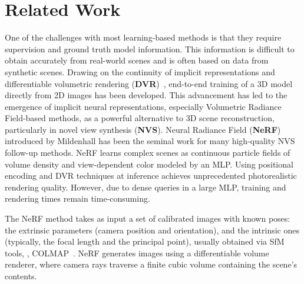 \section{Related Work}
\label{sect:relatedwork}
One of the challenges with most learning-based methods is that they require supervision and ground truth model information. 
This information is difficult to obtain accurately from real-world scenes and is often based on data from synthetic scenes. 
Drawing on the continuity of implicit representations\cite{Park2019DeepSDFLC, Mescheder2018OccupancyNL, Chen2018LearningIF} and differentiable volumetric rendering (\textbf{DVR})~\cite{Lombardi:2019, Sitzmann2018DeepVoxelsLP, Niemeyer2019DifferentiableVR, Sitzmann2019SceneRN}, end-to-end training of a 3D model directly from 2D images has been developed. 
This advancement has led to the emergence of implicit neural representations, especially Volumetric Radiance Field-based methods, as a powerful alternative to 3D scene reconstruction, particularly in novel view synthesis (\textbf{NVS}).
Neural Radiance Field (\textbf{NeRF})~\cite{mildenhall2021nerf} introduced by Mildenhall \etal has been the seminal work for many high-quality NVS follow-up methods.
NeRF learns complex scenes as continuous particle fields of volume density and view-dependent color modeled by an MLP. Using positional encoding and DVR techniques at inference achieves unprecedented photorealistic rendering quality.
However, due to dense queries in a large MLP, training and rendering times remain time-consuming.

The NeRF method takes as input a set of calibrated images with known poses: the extrinsic parameters (camera position and orientation), and the intrinsic ones (typically, the focal length and the principal point), usually obtained via SfM tools, \eg, COLMAP~\cite{schoenberger2016sfm}.
NeRF generates images using a differentiable volume renderer, where camera rays traverse a finite cubic volume containing the scene's contents.

